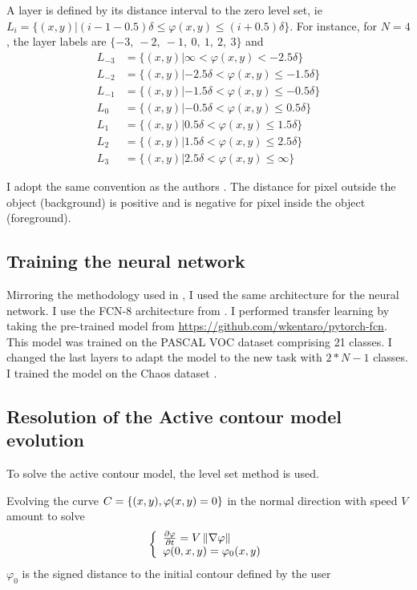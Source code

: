 \documentclass[a4paper, 11pt]{article}
\begin{document}
A layer is defined by its distance interval to the zero level set, ie 
$L_i = \lbrace (x, y) | (i-1 - 0.5)\delta \leq \varphi(x, y) \leq (i + 0.5) \delta \rbrace$. For instance, for $N=4$, the layer labels are $\{-3,\ -2,\ -1,\ 0,\ 1,\ 2,\ 3\}$ and
\begin{align*}
    L_{-3} &= \lbrace (x, y) | \infty < \varphi(x, y) < -2.5 \delta \rbrace \\
    L_{-2} &= \lbrace (x, y) | -2.5 \delta < \varphi(x, y) \leq -1.5 \delta \rbrace \\
    L_{-1} &= \lbrace (x, y) | -1.5 \delta < \varphi(x, y) \leq -0.5 \delta \rbrace \\
    L_{0} &= \lbrace (x, y) | -0.5 \delta < \varphi(x, y) \leq 0.5 \delta \rbrace \\
    L_{1} &= \lbrace (x, y) | 0.5 \delta < \varphi(x, y) \leq 1.5 \delta \rbrace \\
    L_{2} &= \lbrace (x, y) | 1.5 \delta < \varphi(x, y) \leq 2.5 \delta \rbrace \\
    L_{3} &= \lbrace (x, y) | 2.5 \delta < \varphi(x, y) \leq \infty \rbrace
\end{align*}

I adopt the same convention as the authors \cite{guo_automatic_2019}. The distance for pixel outside the object (background) is positive and is negative for pixel inside the object (foreground). 

\subsection{Training the neural network}

Mirroring the methodology used in \cite{guo_automatic_2019}, I used the same architecture for the neural network. I use the FCN-8 architecture from \cite{long_fully_2015}. I performed transfer learning by taking the pre-trained model from \url{https://github.com/wkentaro/pytorch-fcn}. This model was trained on the PASCAL VOC dataset comprising 21 classes. I changed the last layers to adapt the model to the new task with $2*N-1$ classes. I trained the model on the Chaos dataset \cite{kavur_chaos_2019}. 

\subsection{Resolution of the Active contour model evolution}
To solve the active contour model, the level set method is used. 

Evolving the curve $C = \lbrace (x, y), \varphi(x, y) = 0 \rbrace $ in the normal direction with speed $V$ amount to solve \cite{chan_active_2001}
\begin{equation}\label{levelset_eq}
\left\lbrace \begin{array}{l}
    \frac{\partial \varphi}{\partial t} = V\left\lVert\nabla \varphi\right\rVert \\
    \varphi(0, x, y) = \varphi_0(x, y) 
\end{array}
\right.
\end{equation}
$\varphi_0$ is the signed distance to the initial contour defined by the user
\end{document}
